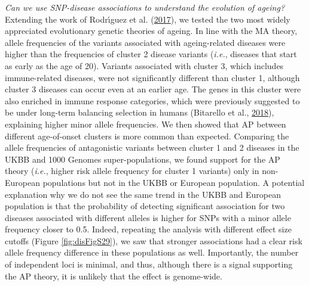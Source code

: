 \documentclass[12pt,twoside]{unicam}
\begin{document}
\emph{Can we use SNP-disease associations to understand the evolution of ageing?} Extending the work of Rodrı́guez et al. (\protect\hyperlink{ref-Rodriguez2017}{2017}), we tested the two most widely appreciated evolutionary genetic theories of ageing. In line with the MA theory, allele frequencies of the variants associated with ageing-related diseases were higher than the frequencies of cluster 2 disease variants (\emph{i.e.}, diseases that start as early as the age of 20). Variants associated with cluster 3, which includes immune-related diseases, were not significantly different than cluster 1, although cluster 3 diseases can occur even at an earlier age. The genes in this cluster were also enriched in immune response categories, which were previously suggested to be under long-term balancing selection in humans (Bitarello et al., \protect\hyperlink{ref-Bitarello2018}{2018}), explaining higher minor allele frequencies. We then showed that AP between different age-of-onset clusters is more common than expected. Comparing the allele frequencies of antagonistic variants between cluster 1 and 2 diseases in the UKBB and 1000 Genomes super-populations, we found support for the AP theory (\emph{i.e.}, higher risk allele frequency for cluster 1 variants) only in non-European populations but not in the UKBB or European population. A potential explanation why we do not see the same trend in the UKBB and European population is that the probability of detecting significant association for two diseases associated with different alleles is higher for SNPs with a minor allele frequency closer to 0.5. Indeed, repeating the analysis with different effect size cutoffs (Figure \ref{fig:disFigS29}), we saw that stronger associations had a clear risk allele frequency difference in these populations as well. Importantly, the number of independent loci is minimal, and thus, although there is a signal supporting the AP theory, it is unlikely that the effect is genome-wide.
\end{document}
